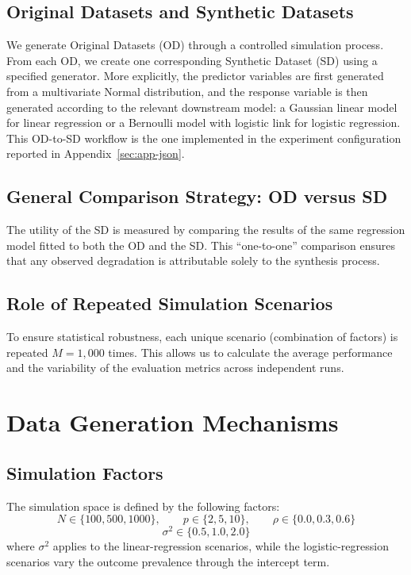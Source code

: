 \subsection{Original Datasets and Synthetic Datasets}
We generate Original Datasets (OD) through a controlled simulation process. From each OD, we create one corresponding Synthetic Dataset (SD) using a specified generator.
More explicitly, the predictor variables are first generated from a multivariate Normal distribution, and the response variable is then generated according to the relevant downstream model: a Gaussian linear model for linear regression or a Bernoulli model with logistic link for logistic regression. This OD-to-SD workflow is the one implemented in the experiment configuration reported in Appendix~\ref{sec:app-json}.

\subsection{General Comparison Strategy: OD versus SD}
The utility of the SD is measured by comparing the results of the same regression model fitted to both the OD and the SD. This ``one-to-one'' comparison ensures that any observed degradation is attributable solely to the synthesis process.

\subsection{Role of Repeated Simulation Scenarios}
To ensure statistical robustness, each unique scenario (combination of factors) is repeated $M = 1,000$ times. This allows us to calculate the average performance and the variability of the evaluation metrics across independent runs.

\section{Data Generation Mechanisms}
\label{sec:reg-generation-mechanisms}

\subsection{Simulation Factors}
The simulation space is defined by the following factors:
\begin{equation}
N \in \{100, 500, 1000\}, \qquad
p \in \{2, 5, 10\}, \qquad
\rho \in \{0.0, 0.3, 0.6\}
\end{equation}
\begin{equation}
\sigma^2 \in \{0.5, 1.0, 2.0\}
\end{equation}
where $\sigma^2$ applies to the linear-regression scenarios, while the logistic-regression scenarios vary the outcome prevalence through the intercept term.

